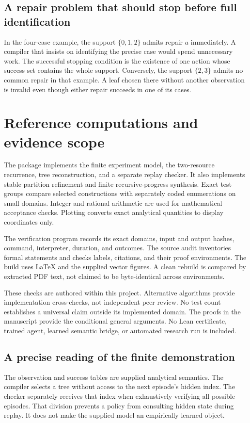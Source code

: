 \documentclass[11pt,letterpaper]{article}
\theoremstyle{plain}
\theoremstyle{definition}
\begin{document}
\subsection{A repair problem that should stop before full identification}
In the four-case example, the support $\{0,1,2\}$ admits repair $a$ immediately. A compiler that insists on identifying the precise case would spend unnecessary work. The successful stopping condition is the existence of one action whose success set contains the whole support. Conversely, the support $\{2,3\}$ admits no common repair in that example. A leaf chosen there without another observation is invalid even though either repair succeeds in one of its cases.

\section{Reference computations and evidence scope}\label{app:checks}
The package implements the finite experiment model, the two-resource recurrence, tree reconstruction, and a separate replay checker. It also implements stable partition refinement and finite recursive-progress synthesis. Exact test groups compare selected constructions with separately coded enumerations on small domains. Integer and rational arithmetic are used for mathematical acceptance checks. Plotting converts exact analytical quantities to display coordinates only.

The verification program records its exact domains, input and output hashes, command, interpreter, duration, and outcomes. The source audit inventories formal statements and checks labels, citations, and their proof environments. The build uses LaTeX and the supplied vector figures. A clean rebuild is compared by extracted PDF text, not claimed to be byte-identical across environments.

These checks are authored within this project. Alternative algorithms provide implementation cross-checks, not independent peer review. No test count establishes a universal claim outside its implemented domain. The proofs in the manuscript provide the conditional general arguments. No Lean certificate, trained agent, learned semantic bridge, or automated research run is included.

\subsection{A precise reading of the finite demonstration}
The observation and success tables are supplied analytical semantics. The compiler selects a tree without access to the next episode's hidden index. The checker separately receives that index when exhaustively verifying all possible episodes. That division prevents a policy from consulting hidden state during replay. It does not make the supplied model an empirically learned object.
\end{document}
